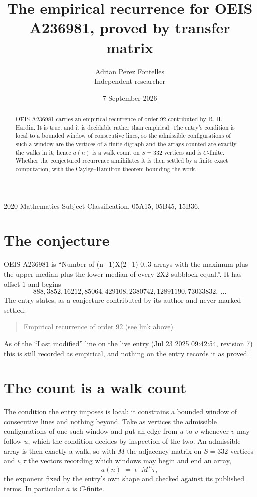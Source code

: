 \documentclass[11pt,a4paper]{article}
\title{The empirical recurrence for OEIS A236981, proved by transfer matrix}
\author{Adrian Perez Fontelles\\ \small Independent researcher}
\date{7 September 2026}
\theoremstyle{plain}
\theoremstyle{definition}
\begin{document}
\maketitle

\begin{abstract}
OEIS A236981 carries an empirical recurrence of order $92$ contributed by R. H. Hardin. It is
true, and it is decidable rather than empirical. The entry's condition is local to a bounded window of consecutive lines, so
the admissible configurations of such a window are the vertices of a finite digraph and the
arrays counted are exactly the walks in it; hence $a(n)$ is a walk count on $S=332$ vertices
and is $C$-finite. Whether the conjectured recurrence annihilates it is then settled by a
finite exact computation, with the Cayley--Hamilton theorem bounding the work.
\end{abstract}

\noindent\small 2020 Mathematics Subject Classification. 05A15, 05B45, 15B36.\normalsize

\section{The conjecture}

OEIS A236981 is ``Number of (n+1)X(2+1) 0..3 arrays with the maximum plus the upper median plus the lower median of every 2X2 subblock equal.''. It has offset $1$ and begins
\[
888, 3852, 16212, 85064, 429108, 2380742, 12891190, 73033832,\ \dots
\]
The entry states, as a conjecture contributed by its author and never marked settled:
\begin{quote}
Empirical recurrence of order 92 (see link above)
\end{quote}
As of the ``Last modified'' line on the live entry (Jul 23 2025 09:42:54, revision 7) this is still
recorded as empirical, and nothing on the entry records it as proved.

\section{The count is a walk count}

The condition the entry imposes is local: it constrains a bounded window of consecutive lines and nothing beyond. Take as
vertices the admissible configurations of one such window and put an edge from $u$ to $v$
whenever $v$ may follow $u$, which the condition decides by inspection of the two. An
admissible array is then exactly a walk, so with $M$ the adjacency matrix on $S=332$ vertices
and $\iota,\tau$ the vectors recording which windows may begin and end an array,
\[
a(n)\;=\;\iota^{\!\top}M^{\,n}\tau ,
\]
the exponent fixed by the entry's own shape and checked against its published terms. In
particular $a$ is $C$-finite.
\end{document}

